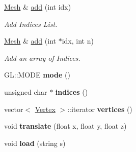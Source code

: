 \begin{DoxyCompactItemize}
\item 
\hypertarget{structvsr_1_1_mesh_a153606d80c11151b4d3852129d3341c6}{\hyperlink{structvsr_1_1_mesh}{Mesh} \& \hyperlink{structvsr_1_1_mesh_a153606d80c11151b4d3852129d3341c6}{add} (int idx)}\label{structvsr_1_1_mesh_a153606d80c11151b4d3852129d3341c6}

\begin{DoxyCompactList}\small\item\em Add Indices List. \end{DoxyCompactList}\item 
\hypertarget{structvsr_1_1_mesh_acaae3d3f85ec80ac94c77547876f4f80}{\hyperlink{structvsr_1_1_mesh}{Mesh} \& \hyperlink{structvsr_1_1_mesh_acaae3d3f85ec80ac94c77547876f4f80}{add} (int $\ast$idx, int n)}\label{structvsr_1_1_mesh_acaae3d3f85ec80ac94c77547876f4f80}

\begin{DoxyCompactList}\small\item\em Add an array of Indices. \end{DoxyCompactList}\item 
\hypertarget{structvsr_1_1_mesh_aa1f5053ba53424b4be9199cb988a06e8}{G\-L\-::\-M\-O\-D\-E {\bfseries mode} ()}\label{structvsr_1_1_mesh_aa1f5053ba53424b4be9199cb988a06e8}

\item 
\hypertarget{structvsr_1_1_mesh_acb6f3d48f2901d03a7be8933cb463696}{unsigned char $\ast$ {\bfseries indices} ()}\label{structvsr_1_1_mesh_acb6f3d48f2901d03a7be8933cb463696}

\item 
\hypertarget{structvsr_1_1_mesh_abc03acee64f3ce59a16e74baced71a2d}{vector$<$ \hyperlink{structvsr_1_1_vertex}{Vertex} $>$\-::iterator {\bfseries vertices} ()}\label{structvsr_1_1_mesh_abc03acee64f3ce59a16e74baced71a2d}

\item 
\hypertarget{structvsr_1_1_mesh_a1e4c0ee0ddd0b0edf996d5c63381331a}{void {\bfseries translate} (float x, float y, float z)}\label{structvsr_1_1_mesh_a1e4c0ee0ddd0b0edf996d5c63381331a}

\item 
\hypertarget{structvsr_1_1_mesh_a3080a2e7dabc9f466c1ba7a8b52e86a6}{void {\bfseries load} (string s)}\label{structvsr_1_1_mesh_a3080a2e7dabc9f466c1ba7a8b52e86a6}

\end{DoxyCompactItemize}
